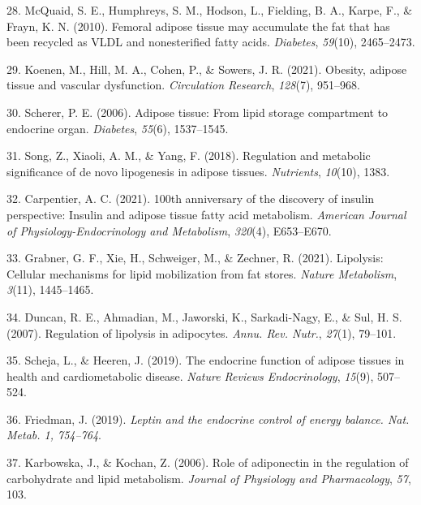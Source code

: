 \documentclass[
  11pt,
  letterpaper,
]{book}
\newlength{\cslhangindent}
\newenvironment{CSLReferences}[2] %
 {\begin{list}{}{%
  \setlength{\itemindent}{0pt}
  \setlength{\leftmargin}{0pt}
  \setlength{\parsep}{0pt}
  \ifodd #1
   \setlength{\leftmargin}{\cslhangindent}
   \setlength{\itemindent}{-1\cslhangindent}
  \fi
  \setlength{\itemsep}{#2\baselineskip}}}
 {\end{list}}
\begin{document}
\begin{CSLReferences}{1}{0}
28. McQuaid, S. E., Humphreys, S. M., Hodson, L., Fielding, B. A.,
Karpe, F., \& Frayn, K. N. (2010). Femoral adipose tissue may accumulate
the fat that has been recycled as VLDL and nonesterified fatty acids.
\emph{Diabetes}, \emph{59}(10), 2465--2473.

29. Koenen, M., Hill, M. A., Cohen, P., \& Sowers, J. R. (2021).
Obesity, adipose tissue and vascular dysfunction. \emph{Circulation
Research}, \emph{128}(7), 951--968.

30. Scherer, P. E. (2006). Adipose tissue: From lipid storage
compartment to endocrine organ. \emph{Diabetes}, \emph{55}(6),
1537--1545.

31. Song, Z., Xiaoli, A. M., \& Yang, F. (2018). Regulation and
metabolic significance of de novo lipogenesis in adipose tissues.
\emph{Nutrients}, \emph{10}(10), 1383.

32. Carpentier, A. C. (2021). 100th anniversary of the discovery of
insulin perspective: Insulin and adipose tissue fatty acid metabolism.
\emph{American Journal of Physiology-Endocrinology and Metabolism},
\emph{320}(4), E653--E670.

33. Grabner, G. F., Xie, H., Schweiger, M., \& Zechner, R. (2021).
Lipolysis: Cellular mechanisms for lipid mobilization from fat stores.
\emph{Nature Metabolism}, \emph{3}(11), 1445--1465.

34. Duncan, R. E., Ahmadian, M., Jaworski, K., Sarkadi-Nagy, E., \& Sul,
H. S. (2007). Regulation of lipolysis in adipocytes. \emph{Annu. Rev.
Nutr.}, \emph{27}(1), 79--101.

35. Scheja, L., \& Heeren, J. (2019). The endocrine function of adipose
tissues in health and cardiometabolic disease. \emph{Nature Reviews
Endocrinology}, \emph{15}(9), 507--524.

36. Friedman, J. (2019). \emph{Leptin and the endocrine control of
energy balance. Nat. Metab. 1, 754--764}.

37. Karbowska, J., \& Kochan, Z. (2006). Role of adiponectin in the
regulation of carbohydrate and lipid metabolism. \emph{Journal of
Physiology and Pharmacology}, \emph{57}, 103.


\end{CSLReferences}
\end{document}
